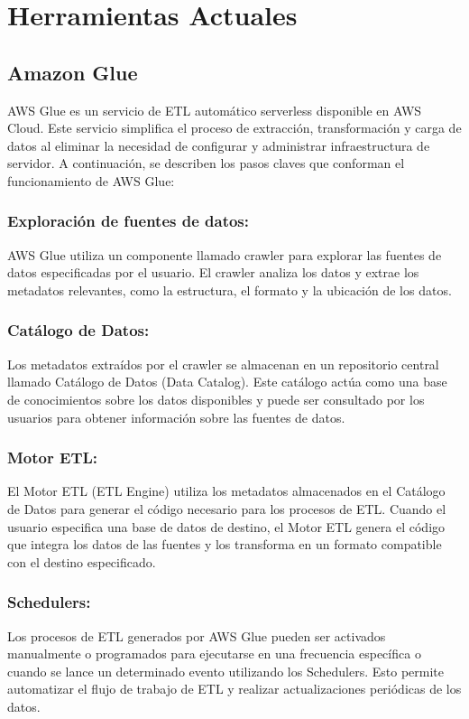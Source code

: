 \section{Herramientas Actuales} \label{section:actual_tools}

\subsection{Amazon Glue}

AWS Glue es un servicio de ETL automático serverless disponible en AWS Cloud. Este servicio simplifica el proceso de 
extracción, transformación y carga de datos al eliminar la necesidad de configurar y administrar infraestructura de 
servidor. A continuación, se describen los pasos claves que conforman el funcionamiento de AWS Glue:

\subsubsection{Exploración de fuentes de datos:}
AWS Glue utiliza un componente llamado crawler para explorar las fuentes de datos 
especificadas por el usuario. El crawler analiza los datos y extrae los metadatos relevantes, como la estructura, el 
formato y la ubicación de los datos.

\subsubsection{Catálogo de Datos:}
Los metadatos extraídos por el crawler se almacenan en un repositorio central llamado Catálogo de 
Datos (Data Catalog). Este catálogo actúa como una base de conocimientos sobre los datos disponibles y puede ser 
consultado por los usuarios para obtener información sobre las fuentes de datos.

\subsubsection{Motor ETL:}
El Motor ETL (ETL Engine) utiliza los metadatos almacenados en el Catálogo de Datos para generar el código 
necesario para los procesos de ETL. Cuando el usuario especifica una base de datos de destino, el Motor ETL genera el 
código que integra los datos de las fuentes y los transforma en un formato compatible con el destino especificado.

\subsubsection{Schedulers:}
Los procesos de ETL generados por AWS Glue pueden ser activados manualmente o programados para ejecutarse en 
una frecuencia específica o cuando se lance un determinado evento utilizando los Schedulers. Esto permite automatizar el 
flujo de trabajo de ETL y realizar actualizaciones periódicas de los datos.





